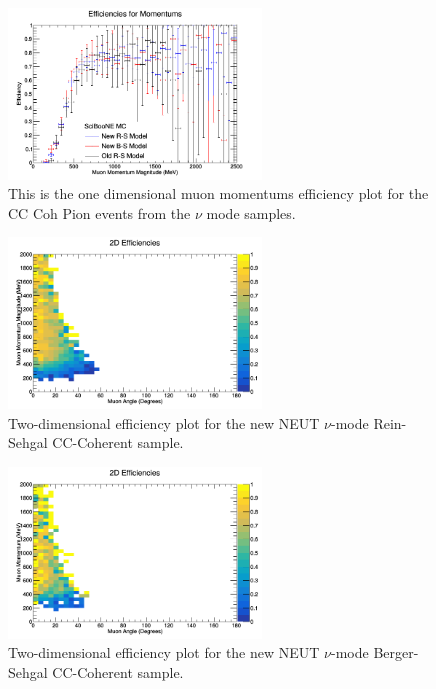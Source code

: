 \documentclass[11pt]{article}
\begin{document}
\begin{figure}[H]
\centering
\includegraphics[width=0.6\textwidth]{NMCombinedPlotsImages/25-NMCombinedPlots.png}
\caption{This is the one dimensional muon momentums efficiency plot for the CC Coh Pion events from the $\nu$ mode samples.}
\end{figure}

\begin{figure}[H]
\centering
\includegraphics[width=0.6\textwidth]{CCCohPlots/2DEffNMRS.png}
\caption{Two-dimensional efficiency plot for the new NEUT $\nu$-mode Rein-Sehgal CC-Coherent sample.}
\end{figure}

\begin{figure}[H]
\centering
\includegraphics[width=0.6\textwidth]{CCCohPlots/2DEffNMBS.png}
\caption{Two-dimensional efficiency plot for the new NEUT $\nu$-mode Berger-Sehgal CC-Coherent sample.}
\end{figure}
\end{document}

